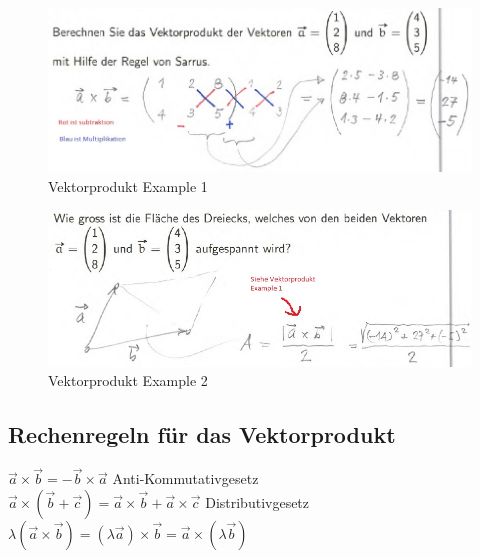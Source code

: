 \begin{figure}[!ht]
	\centering
	\includegraphics[width=0.7\linewidth]{fig/vektorprodukt_example1}
	\caption{Vektorprodukt Example 1}
	\label{fig:vektorprodukt_example1}
\end{figure}

\begin{figure}[!ht]
	\centering
	\includegraphics[width=0.7\linewidth]{fig/vektorprodukt_example2}
	\caption{Vektorprodukt Example 2}
	\label{fig:vektorprodukt_example2}
\end{figure}

\subsection{Rechenregeln für das Vektorprodukt}

\begin{math}
	\vec{a} \times \vec{b} = -\vec{b} \times \vec{a}
\end{math}
Anti-Kommutativgesetz\\
\begin{math}
	\vec{a} \times (\vec{b} + \vec{c}) = \vec{a} \times \vec{b} + \vec{a} \times \vec{c}
\end{math}
Distributivgesetz\\
\begin{math}
	\lambda (\vec{a} \times \vec{b})=
	(\lambda \vec{a}) \times \vec{b} = 
	\vec{a}  \times (\lambda \vec{b})
\end{math}

